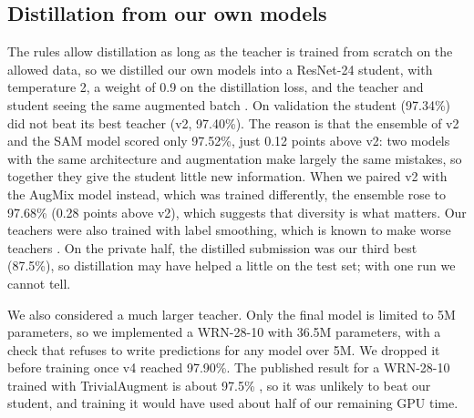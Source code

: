 \documentclass{article}
\begin{document}
\subsection{Distillation from our own models}
\label{sec:kd}
The rules allow distillation as long as the teacher is trained from scratch on the allowed data, so we distilled our own
models into a ResNet-24 student, with temperature 2, a weight of 0.9 on the distillation loss, and the teacher and student
seeing the same augmented batch \citep{beyer2022patient}. On validation the student (97.34\%) did not beat its best teacher
(v2, 97.40\%). The reason is that the ensemble of v2 and the SAM model scored only 97.52\%, just 0.12 points above v2: two
models with the same architecture and augmentation make largely the same mistakes, so together they give the student
little new information. When we paired v2 with the AugMix model instead, which was trained differently, the ensemble rose
to 97.68\% (0.28 points above v2), which suggests that diversity is what matters. Our teachers were also trained with label
smoothing, which is known to make worse teachers \citep{muller2019labelsmoothing}. On the private half, the distilled
submission was our third best (87.5\%), so distillation may have helped a little on the test set; with one run we cannot
tell.

We also considered a much larger teacher. Only the final model is limited to 5M parameters, so we implemented a WRN-28-10
\citep{zagoruyko2016wrn} with 36.5M parameters, with a check that refuses to write predictions for any model over 5M. We
dropped it before training once v4 reached 97.90\%. The published result for a WRN-28-10 trained with TrivialAugment is
about 97.5\% \citep{muller2021trivialaugment}, so it was unlikely to beat our student, and training it would have used
about half of our remaining GPU time.
\end{document}

